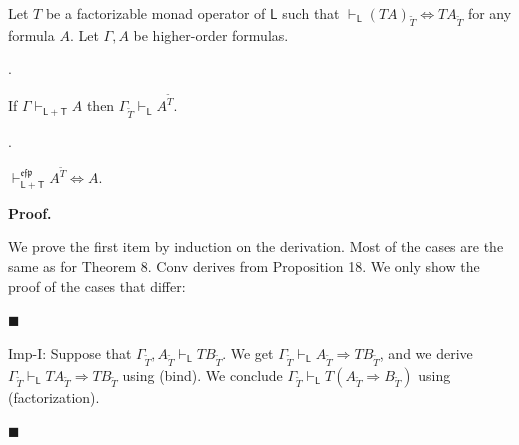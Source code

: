  
Let $T$ be a factorizable monad operator of $\mathsf{L}$ such that $\vdash_{\mathsf{L}}(TA)_{\widetilde{T}}\Leftrightarrow TA_{\widetilde{T}}$ for any formula $A$. Let $\Gamma,A$ be higher-order formulas.\par
  
\par{}. 
 
If $\Gamma\vdash_{\mathsf{L}+\mathsf{T}}A$ then $\Gamma_{\widetilde{T}}\vdash_{\mathsf{L}}A^{\widetilde{T}}$.\par
 
 
 
\par{}. 
 
$\vdash_{\mathsf{L}+\mathsf{T}}^{\mathfrak{e}\mathfrak{f}\mathfrak{p}}A^{\widetilde{T}}\Leftrightarrow A$.\par
 
 
  
 
 
 
\par\medskip\noindent\textbf{Proof.}\par
 
 
We prove the first item by induction on the derivation. Most of the cases are the same as for Theorem 8. Conv derives from Proposition 18. We only show the proof of the cases that differ:\par
  
\par\noindent  $\blacksquare$ 
 
Imp-I: Suppose that $\Gamma_{\widetilde{T}},A_{\widetilde{T}}\vdash_{\mathsf{L}}TB_{\widetilde{T}}$. We get $\Gamma_{\widetilde{T}}\vdash_{\mathsf{L}}A_{\widetilde{T}}\mathbin{\Rightarrow}TB_{\widetilde{T}}$, and we derive $\Gamma_{\widetilde{T}}\vdash_{\mathsf{L}}TA_{\widetilde{T}}\mathbin{\Rightarrow}TB_{\widetilde{T}}$ using (bind). We conclude $\Gamma_{\widetilde{T}}\vdash_{\mathsf{L}}T(A_{\widetilde{T}}\mathbin{\Rightarrow}B_{\widetilde{T}})$ using (factorization).\par
 
 
 
\par\noindent  $\blacksquare$ 
 
